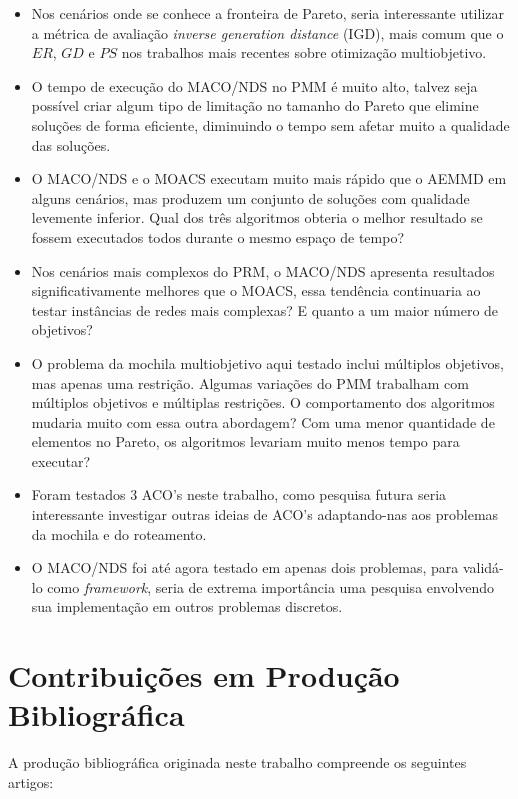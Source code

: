 \begin{itemize}
	\item Nos cenários onde se conhece a fronteira de Pareto, seria interessante utilizar a métrica de avaliação \textit{inverse generation distance} (IGD), mais comum que o $ER$, $GD$ e $PS$ nos trabalhos mais recentes sobre otimização multiobjetivo.
	\item O tempo de execução do MACO/NDS no PMM é muito alto, talvez seja possível criar algum tipo de limitação no tamanho do Pareto que elimine soluções de forma eficiente, diminuindo o tempo sem afetar muito a qualidade das soluções.
	\item O MACO/NDS e o MOACS executam muito mais rápido que o AEMMD em alguns cenários, mas produzem um conjunto de soluções com qualidade levemente inferior. Qual dos três algoritmos obteria o melhor resultado se fossem executados todos durante o mesmo espaço de tempo?
	\item Nos cenários mais complexos do PRM, o MACO/NDS apresenta resultados significativamente melhores que o MOACS, essa tendência continuaria ao testar instâncias de redes mais complexas? E quanto a um maior número de objetivos?
	\item O problema da mochila multiobjetivo aqui testado inclui múltiplos objetivos, mas apenas uma restrição. Algumas variações do PMM trabalham com múltiplos objetivos e múltiplas restrições. O comportamento dos algoritmos mudaria muito com essa outra abordagem? Com uma menor quantidade de elementos no Pareto, os algoritmos levariam muito menos tempo para executar?
	\item Foram testados 3 ACO's neste trabalho, como pesquisa futura seria interessante investigar outras ideias de ACO's adaptando-nas aos problemas da mochila e do roteamento.
	\item O MACO/NDS foi até agora testado em apenas dois problemas, para validá-lo como \textit{framework}, seria de extrema importância uma pesquisa envolvendo sua implementação em outros problemas discretos.
\end{itemize}

\section{Contribuições em Produção Bibliográfica}
A produção bibliográfica originada neste trabalho compreende os seguintes artigos:

